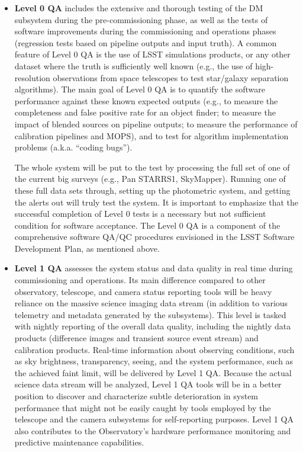 \documentclass[SE,toc]{lsstdoc}
\begin{document}
\begin{itemize}
\item {\bf Level 0 QA} includes the extensive and thorough testing of the DM subsystem
during the pre-commissioning phase, as well as the tests of software improvements
during the commissioning and operations phases (regression tests based on pipeline
outputs and input truth). A common feature of Level 0 QA is
the use of LSST simulations products, or any other dataset where the truth is sufficiently
well known (e.g., the use of high-resolution observations from space telescopes to test
star/galaxy separation algorithms). The main goal of Level 0 QA is to quantify the
software performance against these known expected outputs (e.g., to measure the
completeness and false positive rate for an object finder; to measure the impact of
blended sources on pipeline outputs; to measure the performance of calibration pipelines
and MOPS), and to test for algorithm implementation problems (a.k.a. ``coding bugs'').

The whole system will be put to the test by processing the full set of one of the current big surveys (e.g., Pan STARRS1, SkyMapper). Running one of these full data sets through, setting up the photometric system, and getting the alerts out will truly test the system.
It is important to emphasize that the successful completion of Level 0 tests is a necessary
but not sufficient condition for software acceptance. The Level 0 QA is a component of the comprehensive software QA/QC procedures envisioned in the LSST Software Development Plan, as mentioned above.

\item {\bf Level 1 QA} assesses the system status and data quality in real time during
commissioning and operations. Its
main difference compared to other observatory, telescope, and camera status reporting
tools will be heavy reliance on the massive science imaging data stream (in addition to various
telemetry and metadata generated by the subsystems). This level is tasked
with nightly reporting of the overall data quality, including the nightly data products
(difference images and transient source event stream) and calibration products.
Real-time information about observing conditions, such as sky brightness,
transparency, seeing, and the system performance, such as the achieved faint limit, will be delivered
by Level 1 QA. Because the actual science data stream will be analyzed, Level 1 QA tools will be
in a better position to discover and characterize subtle deterioration in system performance
that might not be easily caught by tools employed by the telescope
and the camera subsystems for self-reporting purposes. Level 1 QA also contributes to the Observatory's hardware performance monitoring and predictive maintenance capabilities.


\end{itemize}
\end{document}
